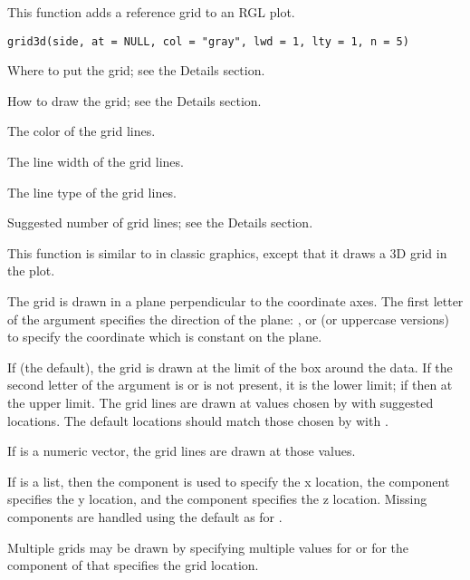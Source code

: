 \documentclass{article}
\begin{document}
\begin{Description}\relax
This function adds a reference grid to an RGL plot.
\end{Description}
\begin{Usage}
\begin{verbatim}
grid3d(side, at = NULL, col = "gray", lwd = 1, lty = 1, n = 5)
\end{verbatim}
\end{Usage}
\begin{Arguments}
\begin{ldescription}
\item[\code{side}] Where to put the grid; see the Details section. 
\item[\code{at}] How to draw the grid; see the Details section. 
\item[\code{col}] The color of the grid lines. 
\item[\code{lwd}] The line width of the grid lines. 
\item[\code{lty}] The line type of the grid lines. 
\item[\code{n}] Suggested number of grid lines; see the Details section. 
\end{ldescription}
\end{Arguments}
\begin{Details}\relax
This function is similar to  in classic graphics,
except that it draws a 3D grid in the plot.

The grid is drawn in a plane perpendicular to the coordinate axes. The
first letter of the  argument specifies the direction of
the plane: ,  or  (or uppercase
versions) to specify the coordinate which is constant on the plane.

If  (the default), the grid is drawn at the limit of 
the box around the data.  If the second letter of the  argument
is  or is not present, it is the lower limit; if 
then at the upper limit.  The grid lines are drawn at values
chosen by  with  suggested locations.
The default locations should match those chosen by 
with .

If  is a numeric vector, the grid lines are drawn at those values.

If  is a list, then the  component is used to
specify the x location, the  component specifies the y location, and
the  component specifies the z location.  Missing components
are handled using the default as for .

Multiple grids may be drawn by specifying multiple values for 
or for the component of  that specifies the grid location.
\end{Details}
\end{document}
